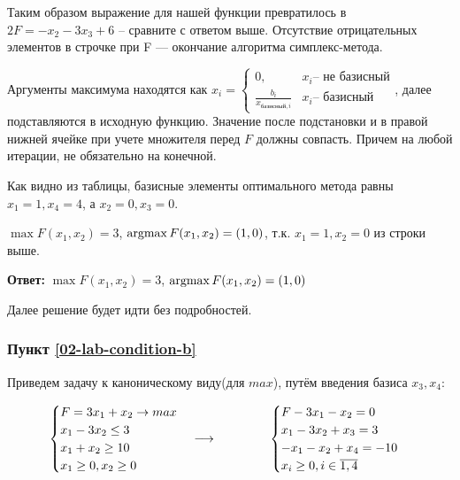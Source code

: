 Таким образом выражение для нашей функции превратилось в $2F = -x_2 - 3x_3 + 6$ -- сравните с ответом выше.
Отсутствие отрицательных элементов в строчке при F --- окончание алгоритма симплекс-метода.

Аргументы максимума находятся как $x_i = \begin{cases}
        0,                                 & x_i \text{-- не базисный} \\
        \frac{b_i}{x_{\text{базисный}, i}} & x_i \text{-- базисный}
    \end{cases}$, далее подставляются в исходную функцию. Значение после подстановки
и в правой нижней ячейке при учете множителя перед $F$ должны совпасть. Причем на любой итерации, не обязательно на конечной.


Как видно из таблицы, базисные элементы оптимального метода равны $x_1 = 1, x_4 = 4$, а $x_2 = 0, x_3 = 0$.

$\max F(x_1, x_2) = 3$, $\operatorname*{argmax} F(x_1, x_2) = (1, 0)$, т.к. $x_1 = 1, x_2 = 0$ из строки выше.

\textbf{Ответ:} $\max F(x_1, x_2) = 3$, $\operatorname*{argmax} F(x_1, x_2) = (1, 0)$ \label{02-lab-a-answer}

Далее решение будет идти без подробностей.

\subsubsection{Пункт \ref{02-lab-condition-b}} \label{02-lab-b}

Приведем задачу к каноническому виду(для $max$), путём введения базиса $x_3, x_4$:

\begin{align*}
    \begin{cases}
        F = 3x_1 + x_2\to max \\
        x_1 - 3x_2 \leq 3     \\
        x_1 + x_2 \geq 10     \\
        x_1 \geq 0, x_2 \geq 0
    \end{cases} \longrightarrow
    \hspace{1.5cm}
    \begin{cases}
        F - 3x_1 - x_2 = 0     \\
        x_1 - 3x_2 + x_3 = 3   \\
        -x_1 - x_2 + x_4 = -10 \\
        x_{i} \geq 0, i\in\overline{1,4}
    \end{cases}
\end{align*}

